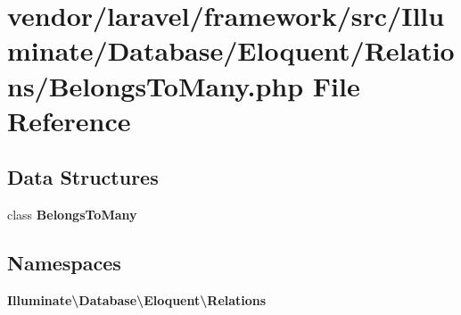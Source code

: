 \section{vendor/laravel/framework/src/\+Illuminate/\+Database/\+Eloquent/\+Relations/\+Belongs\+To\+Many.php File Reference}
\label{_belongs_to_many_8php}
\subsection*{Data Structures}
\begin{DoxyCompactItemize}
\item 
class {\bf Belongs\+To\+Many}
\end{DoxyCompactItemize}
\subsection*{Namespaces}
\begin{DoxyCompactItemize}
\item 
 {\bf Illuminate\textbackslash{}\+Database\textbackslash{}\+Eloquent\textbackslash{}\+Relations}
\end{DoxyCompactItemize}
